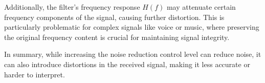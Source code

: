 Additionally, the filter’s frequency response \( H(f) \) may attenuate certain frequency components of the signal, causing further distortion. This is particularly problematic for complex signals like voice or music, where preserving the original frequency content is crucial for maintaining signal integrity.

In summary, while increasing the noise reduction control level can reduce noise, it can also introduce distortions in the received signal, making it less accurate or harder to interpret.

